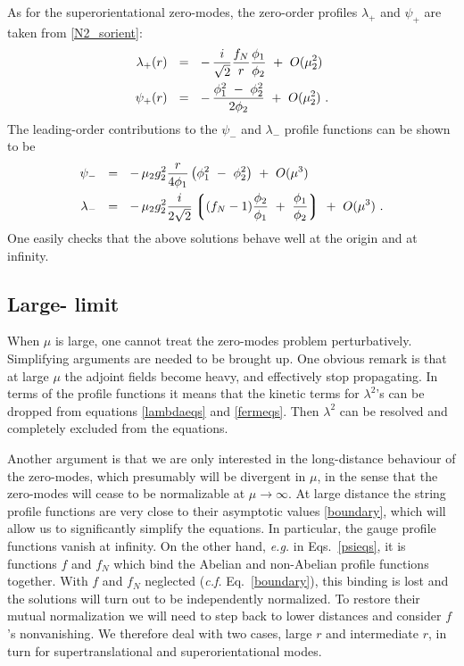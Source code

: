 \documentclass[12pt]{article}
\newcommand{\lgr}{\left\lgroup}
\newcommand{\rgr}{\right\rgroup}
\begin{document}
	As for the superorientational zero-modes, the zero-order profiles $ \lambda_+ $ and $ \psi_+ $ are taken from
	\eqref{N2_sorient}:
\begin{align}
%
\notag
 	\lambda_+(r) & ~~=~~ -\, \frac{i}{\sqrt{2}} \frac{f_N}{r} \frac{\phi_1}{\phi_2}  ~+~ O(\mu_2^2) \\
%
\label{zeroorder}
	\psi_+(r) & ~~=~~ -\, \frac{\phi_1^2 ~-~ \phi_2^2}{2\phi_2} ~+~ O(\mu_2^2)~.
\end{align}
	The leading-order contributions to the $ \psi_- $ and $ \lambda_- $ profile functions can be shown to be 
\begin{align}
%
\notag
	\psi_- & ~~=~~ -\, \mu_2 g_2^2 \frac{r}{4\phi_1} \left( \phi_1^2 ~-~ \phi_2^2 \right)  ~+~ O(\mu^3)
	\\ 
%
\label{firstorder}
	\lambda_- & ~~=~~ -\, \mu_2 g_2^2 \frac{i}{2\sqrt{2}} \lgr (f_N - 1) \frac{\phi_2}{\phi_1} ~+~ \frac{\phi_1}{\phi_2} \rgr ~+~ O(\mu^3)~.
\end{align}
	One easily checks that the above solutions behave well at the origin and at infinity.

\subsection{Large-\boldmath{$\mu$} limit}
	When $ \mu $ is large, one cannot treat the zero-modes problem perturbatively.
	Simplifying arguments are needed to be brought up.
	One obvious remark is that at large $ \mu $ the adjoint fields become heavy,
	and effectively stop propagating.
	In terms of the profile functions it means that the kinetic terms for $ \lambda^2 $'s 
	can be dropped from equations \eqref{lambdaeqs} and \eqref{fermeqs}.
	Then $ \lambda^2 $ can be resolved and completely excluded from the equations.
	
	Another argument is that we are only interested in the long-distance behaviour
	of the zero-modes, which presumably will be divergent in $ \mu $, in the sense that the
	zero-modes will cease to be normalizable at $ \mu \to \infty $.
	At large distance the string profile functions are very close to their asymptotic values \eqref{boundary},
	which will allow us to significantly simplify the equations.
	In particular, the gauge profile functions vanish at infinity.
	On the other hand, {\it e.g.} in Eqs.~\eqref{psieqs}, it is functions $ f $ and $ f_N $ 
	which bind the Abelian and non-Abelian profile functions together.
	With $ f $ and $ f_N $ neglected ({\it c.f.} Eq.~\eqref{boundary}), this binding is lost and 
	the solutions will turn out to be independently normalized.
	To restore their mutual normalization we will need to step back to lower distances and consider
	$ f $'s nonvanishing.
	We therefore deal with two cases, large $ r $ and intermediate $ r $, in turn for supertranslational
	and superorientational modes.
\end{document}
